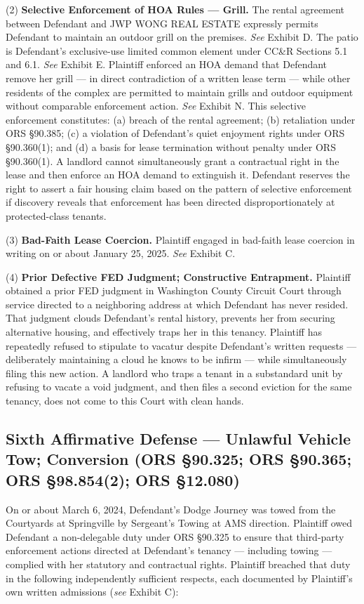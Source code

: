 \documentclass[12pt,letterpaper]{article}
\begin{document}
(2) \textbf{Selective Enforcement of HOA Rules --- Grill.} The rental agreement between Defendant and JWP WONG REAL ESTATE expressly permits Defendant to maintain an outdoor grill on the premises. \textit{See} Exhibit D. The patio is Defendant's exclusive-use limited common element under CC\&R Sections 5.1 and 6.1. \textit{See} Exhibit E. Plaintiff enforced an HOA demand that Defendant remove her grill --- in direct contradiction of a written lease term --- while other residents of the complex are permitted to maintain grills and outdoor equipment without comparable enforcement action. \textit{See} Exhibit N. This selective enforcement constitutes: (a) breach of the rental agreement; (b) retaliation under ORS \S90.385; (c) a violation of Defendant's quiet enjoyment rights under ORS \S90.360(1); and (d) a basis for lease termination without penalty under ORS \S90.360(1). A landlord cannot simultaneously grant a contractual right in the lease and then enforce an HOA demand to extinguish it. Defendant reserves the right to assert a fair housing claim based on the pattern of selective enforcement if discovery reveals that enforcement has been directed disproportionately at protected-class tenants.

(3) \textbf{Bad-Faith Lease Coercion.} Plaintiff engaged in bad-faith lease coercion in writing on or about January 25, 2025. \textit{See} Exhibit C.

(4) \textbf{Prior Defective FED Judgment; Constructive Entrapment.} Plaintiff obtained a prior FED judgment in Washington County Circuit Court through service directed to a neighboring address at which Defendant has never resided. That judgment clouds Defendant's rental history, prevents her from securing alternative housing, and effectively traps her in this tenancy. Plaintiff has repeatedly refused to stipulate to vacatur despite Defendant's written requests --- deliberately maintaining a cloud he knows to be infirm --- while simultaneously filing this new action. A landlord who traps a tenant in a substandard unit by refusing to vacate a void judgment, and then files a second eviction for the same tenancy, does not come to this Court with clean hands.

\subsection{Sixth Affirmative Defense --- Unlawful Vehicle Tow; Conversion (ORS \S90.325; ORS \S90.365; ORS \S98.854(2); ORS \S12.080)}

On or about March 6, 2024, Defendant's Dodge Journey was towed from the Courtyards at Springville by Sergeant's Towing at AMS direction. Plaintiff owed Defendant a non-delegable duty under ORS \S90.325 to ensure that third-party enforcement actions directed at Defendant's tenancy --- including towing --- complied with her statutory and contractual rights. Plaintiff breached that duty in the following independently sufficient respects, each documented by Plaintiff's own written admissions (\textit{see} Exhibit C):
\end{document}
